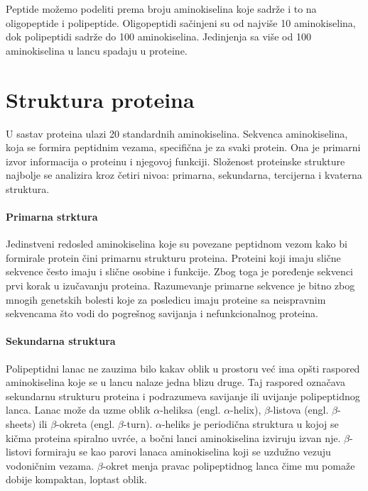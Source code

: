Peptide možemo podeliti prema broju aminokiselina koje sadrže i to na oligopeptide i polipeptide. Oligopeptidi sačinjeni su od najviše 10 aminokiselina, dok polipeptidi sadrže do 100 aminokiselina. Jedinjenja sa više od 100 aminokiselina u lancu spadaju u proteine. \cite{biohUdz}



\section{Struktura proteina}

U sastav proteina ulazi 20 standardnih aminokiselina. Sekvenca aminokiselina, koja se formira peptidnim vezama, specifična je za svaki protein. Ona je primarni izvor informacija o proteinu i njegovoj funkciji. Složenost proteinske strukture najbolje se analizira kroz četiri nivoa: primarna, sekundarna, tercijerna i kvaterna struktura. \cite{biochemestry5}

\paragraph{Primarna strktura} Jedinstveni redosled aminokiselina koje su povezane peptidnom vezom kako bi formirale protein čini primarnu strukturu proteina. Proteini koji imaju slične sekvence često imaju i slične osobine i funkcije. Zbog toga je poređenje sekvenci prvi korak u izučavanju proteina. Razumevanje primarne sekvence je bitno zbog mnogih genetskih bolesti koje za posledicu imaju proteine sa neispravnim sekvencama što vodi do pogrešnog savijanja i nefunkcionalnog proteina. \cite{bioinf, biohUdz, biochemestry5}

\paragraph{Sekundarna struktura} Polipeptidni lanac ne zauzima bilo kakav oblik u prostoru već ima opšti raspored aminokiselina koje se u lancu nalaze jedna blizu druge. Taj raspored označava sekundarnu strukturu proteina i podrazumeva savijanje ili uvijanje polipeptidnog lanca. Lanac može da uzme oblik $\alpha$-heliksa (engl. $\alpha$-helix), $\beta$-listova (engl. $\beta$-sheets) ili $\beta$-okreta (engl. $\beta$-turn). $\alpha$-heliks je periodična struktura u kojoj se kičma proteina spiralno uvrće, a bočni lanci aminokiselina izviruju izvan nje. $\beta$-listovi formiraju se kao parovi lanaca aminokiselina koji se uzdužno vezuju vodoničnim vezama. $\beta$-okret menja pravac polipeptidnog lanca čime mu pomaže dobije kompaktan, loptast oblik. \cite{bioinf, PSF, biochemestry5}

